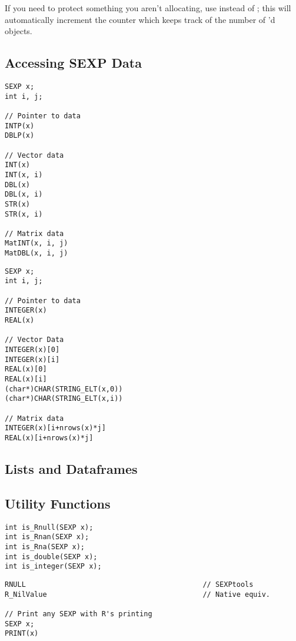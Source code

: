 If you need to protect something you aren't allocating, use  instead 
of ; this will automatically increment the counter which keeps 
track of the number of 'd objects.



\subsection{Accessing SEXP Data}

\begin{center}
\begin{minipage}{.485\textwidth}\centering
\begin{lstlisting}[language=fanC,title=SEXPtools Data Accessors]
SEXP x;
int i, j;

// Pointer to data
INTP(x)
DBLP(x)

// Vector data
INT(x)
INT(x, i)
DBL(x)
DBL(x, i) 
STR(x)
STR(x, i)

// Matrix data
MatINT(x, i, j)
MatDBL(x, i, j) 
\end{lstlisting}
\end{minipage}
\hspace{.2cm}
\begin{minipage}{.485\textwidth}\centering
\begin{lstlisting}[language=fanC,title=Native Data Accessors]
SEXP x;
int i, j;

// Pointer to data
INTEGER(x)
REAL(x)

// Vector Data
INTEGER(x)[0]
INTEGER(x)[i]
REAL(x)[0]
REAL(x)[i]
(char*)CHAR(STRING_ELT(x,0))
(char*)CHAR(STRING_ELT(x,i))

// Matrix data
INTEGER(x)[i+nrows(x)*j]
REAL(x)[i+nrows(x)*j]
\end{lstlisting}
\end{minipage}
\end{center}



\subsection{Lists and Dataframes}





\subsection{Utility Functions}

\begin{lstlisting}[language=fanC,title=Testers]
int is_Rnull(SEXP x);
int is_Rnan(SEXP x);
int is_Rna(SEXP x);
int is_double(SEXP x);
int is_integer(SEXP x);
\end{lstlisting}



\begin{lstlisting}[language=fanC,title=Misc]
RNULL                                          // SEXPtools
R_NilValue                                     // Native equiv.

// Print any SEXP with R's printing
SEXP x;
PRINT(x)
\end{lstlisting}


